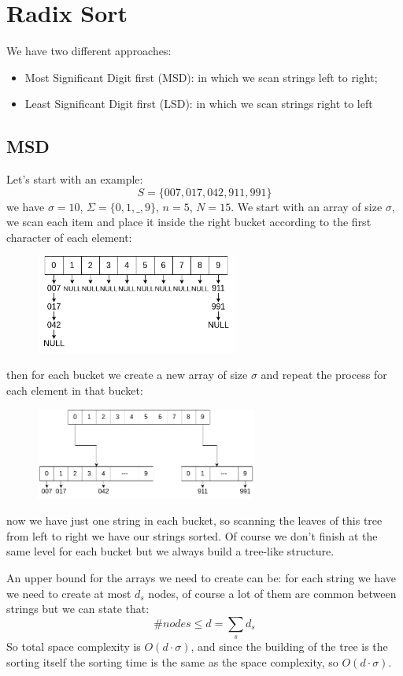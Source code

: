\section{Radix Sort}
We have two different approaches:
\begin{itemize}
    \item Most Significant Digit first (MSD): in which we scan strings left to right;
    \item Least Significant Digit first (LSD): in which we scan strings right to left
\end{itemize}

\subsection{MSD}
Let's start with an example:
$$
    S = \{007, 017, 042, 911, 991\}
$$
we have $\sigma = 10$, $\Sigma = \{0, 1, \_, 9\}$, $n = 5$, $N = 15$.
We start with an array of size $\sigma$, we scan each item and place it inside the right bucket according to the first character of each element:
\begin{figure}[H]
    \centering
    \includegraphics[width=250px]{images/5_String_sorting/radix_sort_MSD_0.png}
\end{figure}
then for each bucket we create a new array of size $\sigma$ and repeat the process for each element in that bucket:
\begin{figure}[H]
    \centering
    \includegraphics[width=275px]{images/5_String_sorting/radix_sort_MSD_1.png}
\end{figure}
now we have just one string in each bucket, so scanning the leaves of this tree from left to right we have our strings sorted.
Of course we don't finish at the same level for each bucket but we always build a tree-like structure.

An upper bound for the arrays we need to create can be: for each string we have we need to create at most $d_s$ nodes, of course a lot of them are common between strings but we can state that:
$$
    \#nodes \leq d = \sum_s d_s
$$
So total space complexity is $O(d \cdot \sigma)$, and since the building of the tree is the sorting itself the sorting time is the same as the space complexity, so $O(d \cdot \sigma)$.

